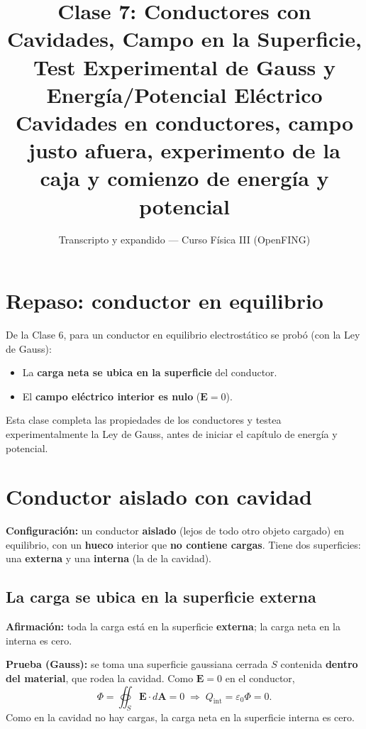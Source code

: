 \documentclass[12pt,a4paper]{article}
\title{\textbf{Clase 7: Conductores con Cavidades, Campo en la Superficie, \\
        Test Experimental de Gauss y Energía/Potencial Eléctrico}\\[0.3em]
        \large{Cavidades en conductores, campo justo afuera, experimento
              de la caja y comienzo de energía y potencial}}
\author{Transcripto y expandido --- Curso Física III (OpenFING)}
\date{}
\begin{document}
\maketitle
\thispagestyle{empty}
\newpage

\tableofcontents
\newpage

\section{Repaso: conductor en equilibrio}

De la Clase 6, para un conductor en equilibrio electrostático se probó
(con la Ley de Gauss):
\begin{itemize}[nosep]
  \item La \textbf{carga neta se ubica en la superficie} del conductor.
  \item El \textbf{campo eléctrico interior es nulo} ($\mathbf{E}=0$).
\end{itemize}

Esta clase completa las propiedades de los conductores y testea
experimentalmente la Ley de Gauss, antes de iniciar el capítulo de
energía y potencial.

\section{Conductor aislado con cavidad}

\textbf{Configuración:} un conductor \textbf{aislado} (lejos de todo
otro objeto cargado) en equilibrio, con un \textbf{hueco} interior que
\textbf{no contiene cargas}. Tiene dos superficies: una \textbf{externa}
y una \textbf{interna} (la de la cavidad).

\subsection{La carga se ubica en la superficie externa}

\textbf{Afirmación:} toda la carga está en la superficie
\textbf{externa}; la carga neta en la interna es cero.

\textbf{Prueba (Gauss):} se toma una superficie gaussiana cerrada $S$
contenida \textbf{dentro del material}, que rodea la cavidad. Como
$\mathbf{E}=0$ en el conductor,
\[
\Phi = \oiint_S \mathbf{E}\cdot d\mathbf{A} = 0
\;\Longrightarrow\; Q_{\text{int}} = \varepsilon_0 \Phi = 0.
\]
Como en la cavidad no hay cargas, la carga neta en la superficie interna
es cero.
\end{document}
